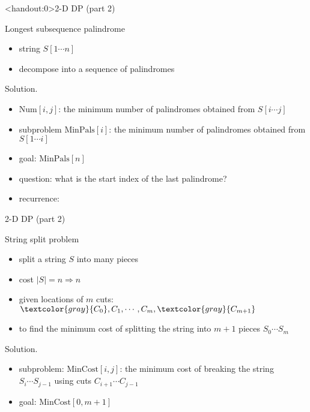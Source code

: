 \begin{frame}<handout:0>{2-D DP (part 2)}
  \begin{exampleblock}{Longest subsequence palindrome }
    \begin{itemize}
      \item string $S[1 \cdots n]$
      \item decompose into a sequence of palindromes
    \end{itemize}
  \end{exampleblock}

  \begin{block}{Solution.}
    \begin{itemize}
      \item $\text{Num}[i,j]$: the minimum number of palindromes obtained from $S[i \cdots j]$
      \item subproblem $\text{MinPals}[i]$: the minimum number of palindromes obtained from $S[1 \cdots i]$
      \item goal: $\text{MinPals}[n]$
      \item question: what is the start index of the last palindrome?
      \item recurrence:
    \end{itemize}
  \end{block}
\end{frame}
\begin{frame}{2-D DP (part 2)}
  \begin{exampleblock}{String split problem }
    \begin{itemize}
      \item split a string $S$ into many pieces
      \item cost $|S| = n \Rightarrow n$
      \item given locations of $m$ cuts: $\textcolor{gray}{C_{0}}, C_{1}, \cdots, C_{m}, \textcolor{gray}{C_{m+1}}$
      \item to find the minimum cost of splitting the string into $m+1$ pieces
	$S_{0} \cdots S_{m}$
    \end{itemize}
  \end{exampleblock}

  \begin{block}{Solution.}
    \begin{itemize}
      \item subproblem: $\text{MinCost}[i,j]$: the minimum cost of breaking the string $S_{i} \cdots S_{j-1}$ using cuts $C_{i+1} \cdots C_{j-1}$
      \item goal: $\text{MinCost}[0,m+1]$
    \end{itemize}
  \end{block}
\end{frame}
